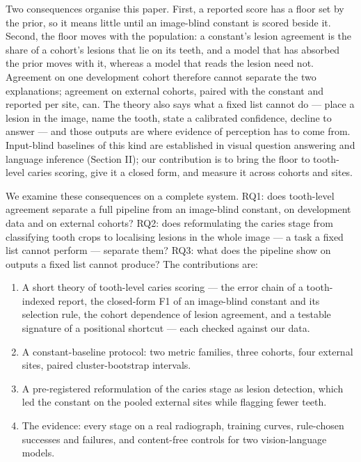 \documentclass[conference]{IEEEtran}
\begin{document}
Two consequences organise this paper. First, a reported score has a floor set by the prior, so it means little until an image-blind constant is scored beside it. Second, the floor moves with the population: a constant's lesion agreement is the share of a cohort's lesions that lie on its teeth, and a model that has absorbed the prior moves with it, whereas a model that reads the lesion need not. Agreement on one development cohort therefore cannot separate the two explanations; agreement on external cohorts, paired with the constant and reported per site, can. The theory also says what a fixed list cannot do — place a lesion in the image, name the tooth, state a calibrated confidence, decline to answer — and those outputs are where evidence of perception has to come from. Input-blind baselines of this kind are established in visual question answering and language inference (Section II); our contribution is to bring the floor to tooth-level caries scoring, give it a closed form, and measure it across cohorts and sites.

We examine these consequences on a complete system. RQ1: does tooth-level agreement separate a full pipeline from an image-blind constant, on development data and on external cohorts? RQ2: does reformulating the caries stage from classifying tooth crops to localising lesions in the whole image — a task a fixed list cannot perform — separate them? RQ3: what does the pipeline show on outputs a fixed list cannot produce? The contributions are:

\begin{enumerate}
\item A short theory of tooth-level caries scoring — the error chain of a tooth-indexed report, the closed-form F1 of an image-blind constant and its selection rule, the cohort dependence of lesion agreement, and a testable signature of a positional shortcut — each checked against our data.
\item A constant-baseline protocol: two metric families, three cohorts, four external sites, paired cluster-bootstrap intervals.
\item A pre-registered reformulation of the caries stage as lesion detection, which led the constant on the pooled external sites while flagging fewer teeth.
\item The evidence: every stage on a real radiograph, training curves, rule-chosen successes and failures, and content-free controls for two vision-language models.
\end{enumerate}
\end{document}
